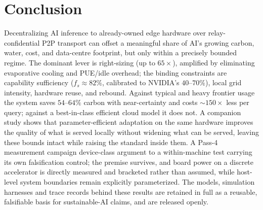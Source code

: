 \documentclass[conference]{IEEEtran}
\newcommand{\fs}{f_{s}}
\begin{document}
\section{Conclusion}
Decentralizing AI inference to already-owned edge hardware over
relay-confidential P2P transport can offset a meaningful share of AI's growing
carbon, water, cost, and data-centre footprint, but only within a precisely
bounded regime. The dominant lever is right-sizing (up to $65\times$), amplified
by eliminating evaporative cooling and PUE/idle overhead; the binding constraints
are capability sufficiency ($\fs\approx82\%$, calibrated to NVIDIA's $40$--$70\%$),
local grid intensity, hardware reuse, and rebound. Against typical and heavy
frontier usage the system saves $54$--$64\%$ carbon with near-certainty and costs
$\sim$$150\times$ less per query; against a best-in-class efficient cloud model it
does not. A companion study \cite{autoyou2026adaptation} shows that
parameter-efficient adaptation on the same hardware improves the quality of what
is served locally without widening what can be served, leaving these bounds
intact while raising the standard inside them. A Pass-4 measurement campaign
device-class argument to a within-machine test carrying its own falsification
control; the premise survives, and board power on a discrete accelerator is
directly measured and bracketed rather than assumed, while host-level system
boundaries remain explicitly parameterized. The models, simulation harnesses and trace
records behind these results are retained in full as a reusable, falsifiable
basis for sustainable-AI claims, and are released openly.
\end{document}
